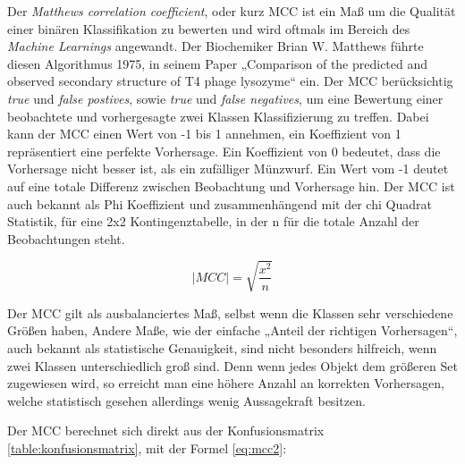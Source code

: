 Der \emph{Matthews correlation coefficient}, oder kurz MCC ist ein Maß um die Qualität einer binären Klassifikation zu bewerten und wird oftmals im Bereich des \emph{Machine Learnings} angewandt. Der Biochemiker Brian W. Matthews führte diesen Algorithmus 1975, in seinem Paper „Comparison of the predicted and observed secondary structure of T4 phage lysozyme“ \cite{Matthews.1975} ein. Der MCC berücksichtig \emph{true} und \emph{false postives}, sowie \emph{true} und \emph{false negatives}, um eine Bewertung einer beobachtete und vorhergesagte zwei Klassen Klassifizierung zu treffen. Dabei kann der MCC einen Wert von -1 bis 1 annehmen, ein Koeffizient von 1 repräsentiert eine perfekte Vorhersage. Ein Koeffizient von 0 bedeutet, dass die Vorhersage nicht besser ist, als ein zufälliger Münzwurf. Ein Wert vom -1 deutet auf eine totale Differenz zwischen Beobachtung und Vorhersage hin. Der MCC ist auch bekannt als Phi Koeffizient und zusammenhängend mit der chi Quadrat Statistik, für eine 2x2 Kontingenztabelle, in der n für die totale Anzahl der Beobachtungen steht.

\begin{equation}
    |MCC| = \sqrt{\frac{x^2}{n}}
    \label{eq:mcc}
\end{equation}

Der MCC gilt als ausbalanciertes Maß, selbst wenn die Klassen sehr verschiedene Größen haben, Andere Maße, wie der einfache „Anteil der richtigen Vorhersagen“, auch bekannt als statistische Genauigkeit, sind nicht besonders hilfreich, wenn zwei Klassen unterschiedlich groß sind. Denn wenn jedes Objekt dem größeren Set zugewiesen wird, so erreicht man eine höhere Anzahl an korrekten Vorhersagen, welche statistisch gesehen allerdings wenig Aussagekraft besitzen.

Der MCC berechnet sich direkt aus der Konfusionsmatrix \ref{table:konfusionsmatrix}, mit der Formel \ref{eq:mcc2}:

\begin{table}[]
    \centering
        \caption{Dargestellt ist die Konfusionsmatrix. tp = \emph{true positives}, fp = \emph{false postives}, tn \emph{truenegatives} und fn = \emph{false negatives}.}
    \label{table:konfusionsmatrix}
\end{table}

